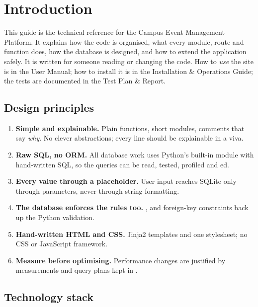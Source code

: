 \documentclass[11pt,a4paper]{article}
\begin{document}

\tableofcontents
\newpage

\section{Introduction}

This guide is the technical reference for the Campus Event Management Platform. It explains how
the code is organised, what every module, route and function does, how the database is designed,
and how to extend the application safely. It is written for someone reading or changing the code.
How to \emph{use} the site is in the User Manual; how to install it is in the Installation \&
Operations Guide; the tests are documented in the Test Plan \& Report.

\subsection{Design principles}

\begin{enumerate}
  \item \textbf{Simple and explainable.} Plain functions, short modules, comments that say
        \emph{why}. No clever abstractions; every line should be explainable in a viva.
  \item \textbf{Raw SQL, no ORM.} All database work uses Python's built-in  module
        with hand-written SQL, so the queries can be read, tested, profiled and ed.
  \item \textbf{Every value through a placeholder.} User input reaches SQLite only through
         parameters, never through string formatting.
  \item \textbf{The database enforces the rules too.} ,  and foreign-key
        constraints back up the Python validation.
  \item \textbf{Hand-written HTML and CSS.} Jinja2 templates and one stylesheet; no CSS or
        JavaScript framework.
  \item \textbf{Measure before optimising.} Performance changes are justified by
         measurements and query plans kept in .
\end{enumerate}

\subsection{Technology stack}
\end{document}
